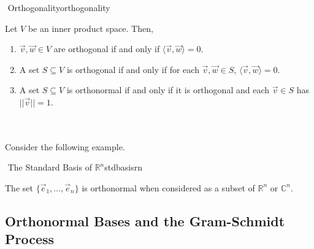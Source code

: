         \begin{definition}{\Stop\,\,Orthogonality}{orthogonality}

            Let \(V\) be an inner product space. Then, 
            \begin{enumerate}
                \item \(\vec{v},\vec{w}\in V\) are orthogonal if and only if \(\langle\vec{v},\vec{w}\rangle=0\).
                \item A set \(S\subseteq V\) is orthogonal if and only if for each \(\vec{v},\vec{w}\in S\), \(\langle\vec{v},\vec{w}\rangle=0\).
                \item A set \(S\subseteq V\) is orthonormal if and only if it is orthogonal and each \(\vec{v}\in S\) has \(||\vec{v}||=1\).
            \end{enumerate}

        \end{definition}
        \vphantom
        \\
        \\
        Consider the following example.
        \begin{example}{\Difficulty\,\,The Standard Basis of \(\mathbb{R}^n\)}{stdbasisrn}

            The set \(\{\vec{e}_1,\ldots,\vec{e}_n\}\) is orthonormal when considered as a subset of \(\mathbb{R}^n\) or \(\mathbb{C}^n\).
            
        \end{example}
        \pagebreak
        
    \subsection{Orthonormal Bases and the Gram-Schmidt Process}

